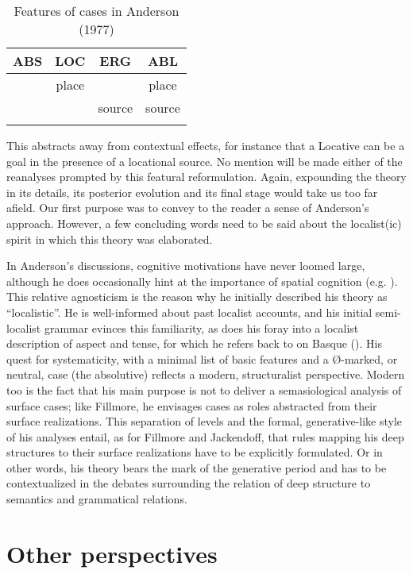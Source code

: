 \documentclass[output=paper]{langscibook}
\begin{document}
\begin{table}
\begin{tabular}{cccc}
\lsptoprule
ABS & LOC & ERG & ABL\\\midrule
& place & & place\\
& &  source & source \\
\lspbottomrule
\end{tabular}
\caption{Features of cases in Anderson (1977)} 
\end{table}

This abstracts away from contextual effects, for instance that a Locative can be a goal in the presence of a locational source. No mention will be made either of the reanalyses prompted by this featural reformulation. Again, expounding the theory in its details, its posterior evolution and its final stage would take us too far afield. Our first purpose was to convey to the reader a sense of Anderson’s approach. However, a few concluding words need to be said about the localist(ic) spirit in which this theory was elaborated.

In Anderson’s discussions, cognitive motivations have never loomed large, although he does occasionally hint at the importance of spatial cognition (e.g. \citealt{anderson_localism_1994}). This relative agnosticism is the reason why he initially described his theory as “localistic”. He is well-informed about past localist accounts, and his initial semi-localist grammar evinces this familiarity, as does his foray into a localist description of aspect and tense, for which he refers back to \citet{darrigol_dissertation_1827} on Basque (\citealt{anderson_essay_1973}). His quest for systematicity, with a minimal list of basic features and a Ø-marked, or neutral, case (the absolutive) reflects a modern, structuralist perspective. Modern too is the fact that his main purpose is not to deliver a semasiological analysis of surface cases; like Fillmore, he envisages cases as roles abstracted from their surface realizations. This separation of levels and the formal, generative-like style of his analyses entail, as for Fillmore and Jackendoff, that rules mapping his deep structures to their surface realizations have to be explicitly formulated. Or in other words, his theory bears the mark of the generative period and has to be contextualized in the debates surrounding the relation of deep structure to semantics and grammatical relations.

\section{Other perspectives}
\end{document}
